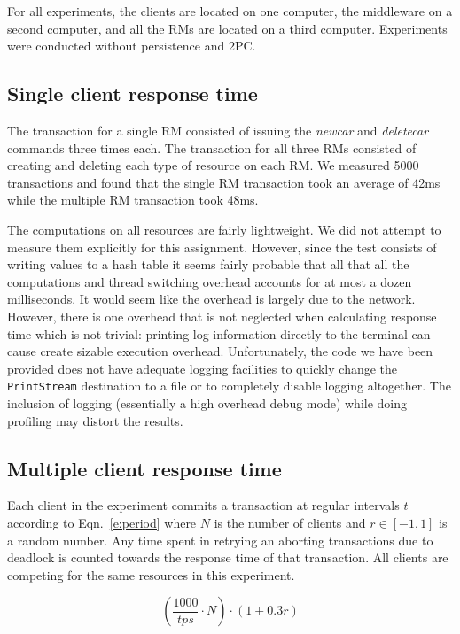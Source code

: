 \documentclass{article}
\begin{document}
For all experiments, the clients are located on one computer, the middleware on a second computer, and all the RMs are located on a third computer. Experiments were conducted without persistence and 2PC.

\subsection{Single client response time}

The transaction for a single RM consisted of issuing the \textit{newcar} and \textit{deletecar} commands three times each. The transaction for all three RMs consisted of creating and deleting each type of resource on each RM. We measured 5000 transactions and found that the single RM transaction took an average of 42ms while the multiple RM transaction took 48ms. 

The computations on all resources are fairly lightweight. We did not attempt to measure them explicitly for this assignment. However, since the test consists of writing values to a hash table it seems fairly probable that all that all the computations and thread switching overhead accounts for at most a dozen milliseconds. It would seem like the overhead is largely due to the network. However, there is one overhead that is not neglected when calculating response time which is not trivial: printing log information directly to the terminal can cause create sizable execution overhead. Unfortunately, the code we have been provided does not have adequate logging facilities to quickly change the \texttt{PrintStream} destination to a file or to completely disable logging altogether. The inclusion of logging (essentially a high overhead debug mode) while doing profiling may distort the results.

\subsection{Multiple client response time}

Each client in the experiment commits a transaction at regular intervals $t$ according to Eqn.~\ref{e:period} where $N$ is the number of clients and $r \in [-1,1]$ is a random number. Any time spent in retrying an aborting transactions due to deadlock is counted towards the response time of that transaction. All clients are competing for the same resources in this experiment. 

\begin{equation}
\left(\frac{1000}{tps}\cdot N\right) \cdot(1 + 0.3r)
\label{e:period}
\end{equation}
\end{document}
